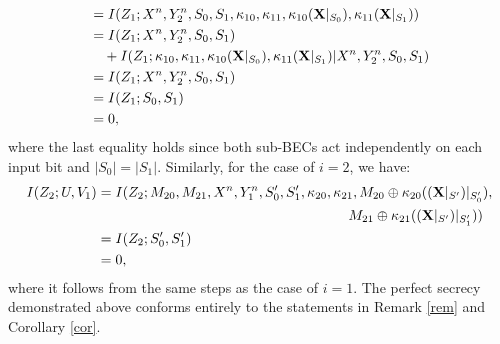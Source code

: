 \documentclass[runningheads]{llncs}
\begin{document}
\begin{itemize}
\begin{align}
        & = I(Z_1;X^n, Y_2^n, S_0,S_1, \kappa_{10}, \kappa_{11}, \kappa_{10} (\mathbf{X}|_{S_0}), \kappa_{11}(\mathbf{X}|_{S_1}))\notag\\
        & = I(Z_1;X^n, Y_2^n, S_0,S_1)\notag\\
        & \quad + I(Z_1; \kappa_{10}, \kappa_{11}, \kappa_{10} (\mathbf{X}|_{S_0}), \kappa_{11}(\mathbf{X}|_{S_1})|X^n, Y_2^n, S_0,S_1)\notag\\
        & = I(Z_1;X^n, Y_2^n, S_0,S_1)\notag\\
        & = I(Z_1; S_0,S_1)\notag\\
        & = 0,
    \end{align}
    where the last equality holds since both sub-BECs act independently on each input bit and $|S_{0}|=|S_{1}|$. Similarly, for the case of $i=2$, we have:
    \begin{align*}
        I(Z_2;U,V_1)&=  I(Z_2;M_{20},M_{21}, X^n, Y_1^n, S'_0,S'_1, \kappa_{20},\kappa_{21},M_{20}\oplus\kappa_{20} ((\mathbf{X}|_{S'})|_{S'_0}),\notag\\
        & \qquad\qquad\qquad\qquad\qquad\qquad\qquad\qquad\qquad M_{21}\oplus\kappa_{21}((\mathbf{X}|_{S'})|_{S'_1}))\\
        & = I(Z_2;S'_0,S'_1)\\
        & = 0,
    \end{align*}
    where it follows from the same steps as the case of $i=1$. The perfect secrecy demonstrated above conforms entirely to the statements in Remark \ref{rem} and Corollary \ref{cor}.
    

\end{itemize}
\end{document}
